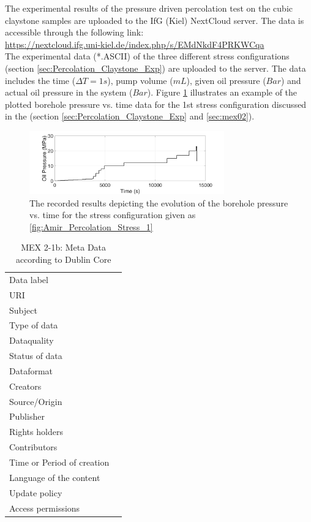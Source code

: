 The experimental results of the pressure driven percolation test on the cubic claystone samples are uploaded to the IfG (Kiel) NextCloud server. The data is accessible through the following link:\\
\hyperlink{https://nextcloud.ifg.uni-kiel.de/index.php/s/EMdNkdF4PRKWCqa}{https://nextcloud.ifg.uni-kiel.de/index.php/s/EMdNkdF4PRKWCqa}\\

The experimental data (*.ASCII) of the three different stress configurations (section \ref{sec:Percolation_Claystone_Exp}) are uploaded to the server. The data includes the time ($\Delta T=1s$), pump volume ($mL$), given oil pressure ($Bar$) and actual oil pressure in the system ($Bar$). Figure \ref{fig:Amir_Percolation_Time_Pressure1_Data}
illustrates an example of the plotted borehole pressure vs. time data for the 1st stress configuration discussed in the (section \ref{sec:Percolation_Claystone_Exp} and \ref{sec:mex02}).

\begin{figure}[!ht]
\centering
\includegraphics[width=0.75\textwidth]{figures/Amir_Percolation_Time_Pressure1_Data.png}
\caption{The recorded results depicting the evolution of the borehole pressure vs. time for the stress configuration given as \ref{fig:Amir_Percolation_Stress_1}}
\label{fig:Amir_Percolation_Time_Pressure1_Data}
\end{figure}

\begin{table}[h!]
\caption{MEX 2-1b: Meta Data according to Dublin Core}
\label{tab:}
\small
\begin{tabular}{R{3cm}|L{7cm}}
\hline
%
Data label &  \\
URI &  \\
Subject  &  \\
Type of data  &  \\
Dataquality  &  \\
Status of data  &  \\
Dataformat  & \\
Creators  &  \\
Source/Origin &  \\
Publisher  &  \\
Rights holders &  \\
Contributors &  \\
Time or Period of creation &  \\
Language of the content &  \\
Update policy &  \\
Access permissions &  \\
%
\hline
\end{tabular}
\end{table}

